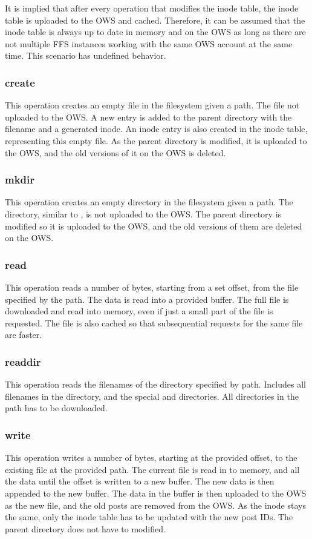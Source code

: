 It is implied that after every operation that modifies the inode table, the inode table is uploaded to the OWS and cached. Therefore, it can be assumed that the inode table is always up to date in memory and on the OWS as long as there are not multiple FFS instances working with the same OWS account at the same time. This scenario has undefined behavior. 

\subsubsection{create}
This operation creates an empty file in the filesystem given a path. The file not uploaded to the OWS. A new entry is added to the parent directory with the filename and a generated inode. An inode entry is also created in the inode table, representing this empty file. As the parent directory is modified, it is uploaded to the OWS, and the old versions of it on the OWS is deleted.

\subsubsection{mkdir}
This operation creates an empty directory in the filesystem given a path. The directory, similar to , is not uploaded to the OWS. The parent directory is modified so it is uploaded to the OWS, and the old versions of them are deleted on the OWS.

\subsubsection{read}
This operation reads a number of bytes, starting from a set offset, from the file specified by the path. The data is read into a provided buffer. The full file is downloaded and read into memory, even if just a small part of the file is requested. The file is also cached so that subsequential requests for the same file are faster. 

\subsubsection{readdir}
This operation reads the filenames of the directory specified by path. Includes all filenames in the directory, and the special  and  directories. All directories in the path has to be downloaded.

\subsubsection{write}
This operation writes a number of bytes, starting at the provided offset, to the existing file at the provided path. The current file is read in to memory, and all the data until the offset is written to a new buffer. The new data is then appended to the new buffer. The data in the buffer is then uploaded to the OWS as the new file, and the old posts are removed from the OWS. As the inode stays the same, only the inode table has to be updated with the new post IDs. The parent directory does not have to modified. 

